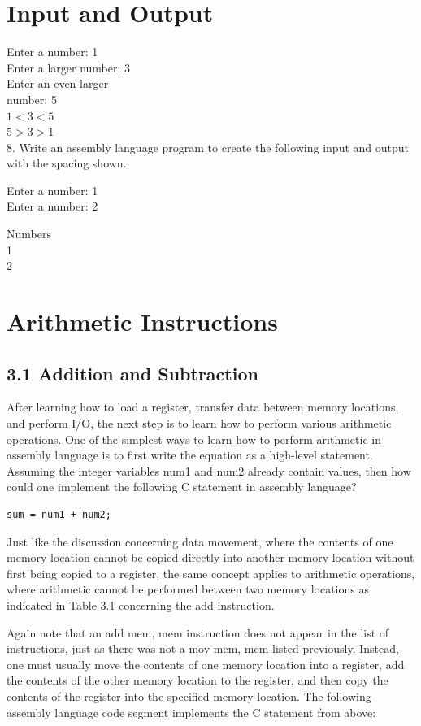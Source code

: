 \documentclass[10pt]{book}
\begin{document}
\section*{Input and Output}
Enter a number: 1\\
Enter a larger number: 3\\
Enter an even larger\\
number: 5\\
$1<3<5$\\
$5>3>1$\\
8. Write an assembly language program to create the following input and output with the spacing shown.

Enter a number: 1\\
Enter a number: 2

Numbers\\
1\\
2

\section*{Arithmetic Instructions}
\subsection*{3.1 Addition and Subtraction}
After learning how to load a register, transfer data between memory locations, and perform I/O, the next step is to learn how to perform various arithmetic operations. One of the simplest ways to learn how to perform arithmetic in assembly language is to first write the equation as a high-level statement. Assuming the integer variables num1 and num2 already contain values, then how could one implement the following C statement in assembly language?


\begin{verbatim}
sum = num1 + num2;
\end{verbatim}

Just like the discussion concerning data movement, where the contents of one memory location cannot be copied directly into another memory location without first being copied to a register, the same concept applies to arithmetic operations, where arithmetic cannot be performed between two memory locations as indicated in Table 3.1 concerning the add instruction.

Again note that an add mem, mem instruction does not appear in the list of instructions, just as there was not a mov mem, mem listed previously. Instead, one must usually move the contents of one memory location into a register, add the contents of the other memory location to the register, and then copy the contents of the register into the specified memory location. The following assembly language code segment implements the C statement from above:
\end{document}

